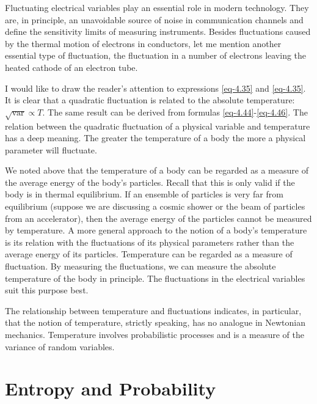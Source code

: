 Fluctuating electrical variables play an essential role in modern technology. They are, in principle, an unavoidable source of noise in communication channels and define the sensitivity limits of measuring instruments. Besides fluctuations caused by the thermal motion of electrons in conductors, let me mention another essential type of fluctuation, the fluctuation in a number of electrons leaving the heated cathode of an electron tube.

 I would like to draw the reader's
attention to expressions \eqref{eq-4.35} and \eqref{eq-4.35}. It is clear that a quadratic fluctuation is related to the absolute temperature: $\sqrt{\text{var}} \propto T$. The same result can be derived from formulas \eqref{eq-4.44}-\eqref{eq-4.46}. The relation between the quadratic fluctuation of a physical variable and temperature has a deep meaning. The greater the temperature of a body the more a physical parameter will fluctuate.

We noted above that the temperature of a body can be regarded as a measure of the average energy of the body's particles. Recall that this is only valid if the body is in thermal equilibrium. If an ensemble of particles is very far from equilibrium (suppose we are discussing a cosmic shower or the beam of particles from an accelerator), then the average energy of the particles cannot be measured by temperature. A more general approach to the notion of a body's temperature is its relation with the fluctuations of its physical parameters rather than the average energy of its particles. Temperature can be regarded as a measure of fluctuation. By measuring the fluctuations, we can measure the absolute temperature of the body in principle. The fluctuations in the electrical variables suit this purpose best.

The relationship between temperature and fluctuations indicates, in particular, that the notion of temperature, strictly speaking, has no analogue in Newtonian mechanics. Temperature involves probabilistic processes and is a measure of the variance of random variables.

\section{Entropy and Probability }

